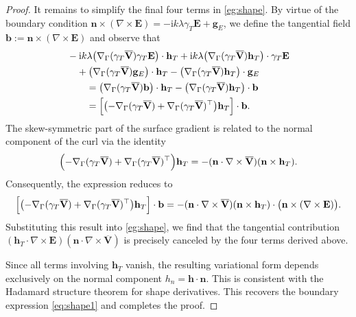 \documentclass[12pt,reqno]{amsart}
\theoremstyle{definition}
\numberwithin{equation}{section}
\begin{document}
\begin{proof}
It remains to simplify the final four terms in \eqref{eg:shape}. By virtue of the boundary condition $\mathbf{n} \times (\nabla \times \mathbf{E}) = -\mathrm{i}k\lambda \gamma_T\mathbf{E} + \mathbf{g}_E$, we define the tangential field $\mathbf{b} := \mathbf{n} \times (\nabla \times \mathbf{E})$ and observe that
\[
\begin{aligned}
&-\mathrm{i}k\lambda \bigl( \nabla_\Gamma(\gamma_T\overline{\mathbf{V}}) \gamma_T\mathbf{E} \bigr) \cdot \mathbf{h}_T + \mathrm{i}k\lambda \bigl( \nabla_\Gamma(\gamma_T\overline{\mathbf{V}}) \mathbf{h}_T \bigr) \cdot \gamma_T\mathbf{E} \\
&\quad + \bigl( \nabla_\Gamma(\gamma_T\overline{\mathbf{V}}) \mathbf{g}_E \bigr) \cdot \mathbf{h}_T - \bigl( \nabla_\Gamma(\gamma_T\overline{\mathbf{V}}) \mathbf{h}_T \bigr) \cdot \mathbf{g}_E \\
&\qquad = \bigl( \nabla_\Gamma(\gamma_T\overline{\mathbf{V}}) \mathbf{b} \bigr) \cdot \mathbf{h}_T - \bigl( \nabla_\Gamma(\gamma_T\overline{\mathbf{V}}) \mathbf{h}_T \bigr) \cdot \mathbf{b} \\
&\qquad = \Bigl[ \bigl( -\nabla_\Gamma(\gamma_T\overline{\mathbf{V}}) + \nabla_\Gamma(\gamma_T\overline{\mathbf{V}})^{\top} \bigr) \mathbf{h}_T \Bigr] \cdot \mathbf{b}.
\end{aligned}
\]
The skew-symmetric part of the surface gradient is related to the normal component of the curl via the identity
\[
\Bigl( -\nabla_\Gamma(\gamma_T\overline{\mathbf{V}}) + \nabla_\Gamma(\gamma_T\overline{\mathbf{V}})^{\top} \Bigr) \mathbf{h}_T = -(\mathbf{n} \cdot \nabla \times \overline{\mathbf{V}}) (\mathbf{n} \times \mathbf{h}_T).
\]
Consequently, the expression reduces to
\[
\Bigl[ \bigl( -\nabla_\Gamma(\gamma_T\overline{\mathbf{V}}) + \nabla_\Gamma(\gamma_T\overline{\mathbf{V}})^{\top} \bigr) \mathbf{h}_T \Bigr] \cdot \mathbf{b} = -(\mathbf{n} \cdot \nabla \times \overline{\mathbf{V}}) (\mathbf{n} \times \mathbf{h}_T) \cdot \bigl( \mathbf{n} \times (\nabla \times \mathbf{E}) \bigr).
\]
Substituting this result into \eqref{eg:shape}, we find that the tangential contribution $(\mathbf{h}_T \cdot \nabla \times \mathbf{E}) (\mathbf{n} \cdot \nabla \times \overline{\mathbf{V}})$ is precisely canceled by the four terms derived above. 

Since all terms involving $\mathbf{h}_T$ vanish, the resulting variational form depends exclusively on the normal component $h_n = \mathbf{h} \cdot \mathbf{n}$. This is consistent with the Hadamard structure theorem for shape derivatives. This recovers the boundary expression \eqref{eq:shape1} and completes the proof.





\end{proof}
\end{document}
